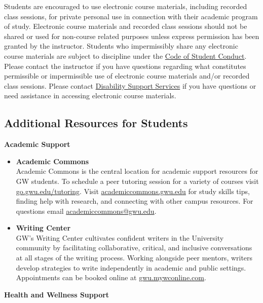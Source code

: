 \documentclass[12pt,letterpaper]{article}
\begin{document}
Students are encouraged to use electronic course materials, including recorded class sessions, for private personal use in connection with their academic program of study. Electronic course materials and recorded class sessions should not be shared or used for non-course related purposes unless express permission has been granted by the instructor. Students who impermissibly share any electronic course materials are subject to discipline under the \href{https://studentconduct.gwu.edu/code-student-conduct}{Code of Student Conduct}. Please contact the instructor if you have questions regarding what constitutes permissible or impermissible use of electronic course materials and/or recorded class sessions. Please contact \href{https://disabilitysupport.gwu.edu/}{Disability Support Services} if you have questions or need assistance in accessing electronic course materials.

\subsection*{Additional Resources for Students}

\textbf{Academic Support}

\begin{itemize}
    \item \textbf{Academic Commons} \\
    Academic Commons is the central location for academic support resources for GW students. To schedule a peer tutoring session for a variety of courses visit \href{https://go.gwu.edu/tutoring}{go.gwu.edu/tutoring}. Visit \href{https://academiccommons.gwu.edu}{academiccommons.gwu.edu} for study skills tips, finding help with research, and connecting with other campus resources. For questions email \href{mailto:academiccommons@gwu.edu}{academiccommons@gwu.edu}.
    \item \textbf{Writing Center} \\
    GW’s Writing Center cultivates confident writers in the University community by facilitating collaborative, critical, and inclusive conversations at all stages of the writing process. Working alongside peer mentors, writers develop strategies to write independently in academic and public settings. Appointments can be booked online at \href{https://gwu.mywconline.com}{gwu.mywconline.com}.
\end{itemize}

\textbf{Health and Wellness Support}
\end{document}
